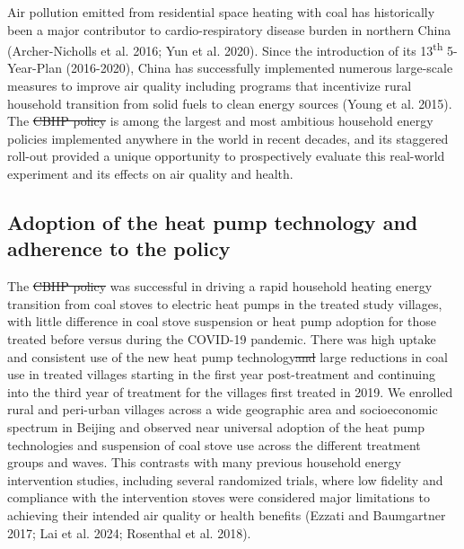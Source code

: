 \documentclass[
  letterpaper,
  DIV=11,
  numbers=noendperiod]{scrartcl}
\makeatletter
\providecommand{\DIFadd}[1]{{\protect\color{blue}\uwave{#1}}} %
\providecommand{\DIFdel}[1]{{\protect\color{red}\sout{#1}}} %
\providecommand{\DIFaddbegin}{} %
\providecommand{\DIFaddend}{} %
\providecommand{\DIFdelbegin}{} %
\providecommand{\DIFdelend}{} %
\newcommand{\DIFscaledelfig}{0.5}
\newlength{\DIFdelgraphicswidth} %
\newlength{\DIFdelgraphicsheight} %
\newcommand{\DIFaddincludegraphics}[2][]{{\color{blue}\fbox{\DIFOincludegraphics[#1]{#2}}}} %
\newcommand{\DIFdelincludegraphics}[2][]{%
\sbox{\DIFdelgraphicsbox}{\DIFOincludegraphics[#1]{#2}}%
\settoboxwidth{\DIFdelgraphicswidth}{\DIFdelgraphicsbox} %
\settoboxtotalheight{\DIFdelgraphicsheight}{\DIFdelgraphicsbox} %
\scalebox{\DIFscaledelfig}{%
\parbox[b]{\DIFdelgraphicswidth}{\usebox{\DIFdelgraphicsbox}\\[-\baselineskip] \rule{\DIFdelgraphicswidth}{0em}}\llap{\resizebox{\DIFdelgraphicswidth}{\DIFdelgraphicsheight}{%
\setlength{\unitlength}{\DIFdelgraphicswidth}%
\begin{picture}(1,1)%
\thicklines\linethickness{2pt} %
{\color[rgb]{1,0,0}\put(0,0){\framebox(1,1){}}}%
{\color[rgb]{1,0,0}\put(0,0){\line( 1,1){1}}}%
{\color[rgb]{1,0,0}\put(0,1){\line(1,-1){1}}}%
\end{picture}%
}\hspace*{3pt}}} %
} %
\DeclareRobustCommand{\DIFaddbegin}{\DIFOaddbegin \let\includegraphics\DIFaddincludegraphics} %
\DeclareRobustCommand{\DIFaddend}{\DIFOaddend \let\includegraphics\DIFOincludegraphics} %
\DeclareRobustCommand{\DIFdelbegin}{\DIFOdelbegin \let\includegraphics\DIFdelincludegraphics} %
\DeclareRobustCommand{\DIFdelend}{\DIFOaddend \let\includegraphics\DIFOincludegraphics} %
\let\sout@orig\sout %
\renewcommand{\sout}[1]{\ifmmode\text{\sout@orig{\ensuremath{#1}}}\else\sout@orig{#1}\fi} %
\makeatother
\begin{document}
Air pollution emitted from residential space heating with coal has
historically been a major contributor to cardio-respiratory disease
burden in northern China (Archer-Nicholls et al. 2016; Yun et al. 2020).
Since the introduction of its 13\textsuperscript{th} 5-Year-Plan
(2016-2020), China has successfully implemented numerous large-scale
measures to improve air quality including programs that incentivize
rural household transition from solid fuels to clean energy sources
(Young et al. 2015). The \DIFdelbegin \DIFdel{CBHP policy }\DIFdelend \DIFaddbegin \DIFadd{CHP }\DIFaddend is among the largest and most ambitious
household energy policies implemented anywhere in the world in recent
decades, and its staggered roll-out provided a unique opportunity to
prospectively evaluate this real-world experiment and its effects on air
quality and health.

\subsection{Adoption of the heat pump technology and adherence to the
policy}\label{adoption-of-the-heat-pump-technology-and-adherence-to-the-policy}

The \DIFdelbegin \DIFdel{CBHP policy }\DIFdelend \DIFaddbegin \DIFadd{CHP }\DIFaddend was successful in driving a rapid household heating energy
transition from coal stoves to electric heat pumps in the treated study
villages, with little difference in coal stove suspension or heat pump
adoption for those treated before versus during the COVID-19 pandemic.
There was high uptake and consistent use of the new heat pump
technology\DIFdelbegin \DIFdel{and }\DIFdelend \DIFaddbegin \DIFadd{, as well as }\DIFaddend large reductions in coal use in treated villages
starting in the first year post-treatment and continuing into the third
year of treatment for the villages first treated in 2019. We enrolled
rural and peri-urban villages across a wide geographic area and
socioeconomic spectrum in Beijing and observed near universal adoption
of the heat pump technologies and suspension of coal stove use across
the different treatment groups and waves. This contrasts with many
previous household energy intervention studies, including several
randomized trials, where low fidelity and compliance with the
intervention stoves were considered major limitations to achieving their
intended air quality or health benefits (Ezzati and Baumgartner 2017;
Lai et al. 2024; Rosenthal et al. 2018).
\end{document}
